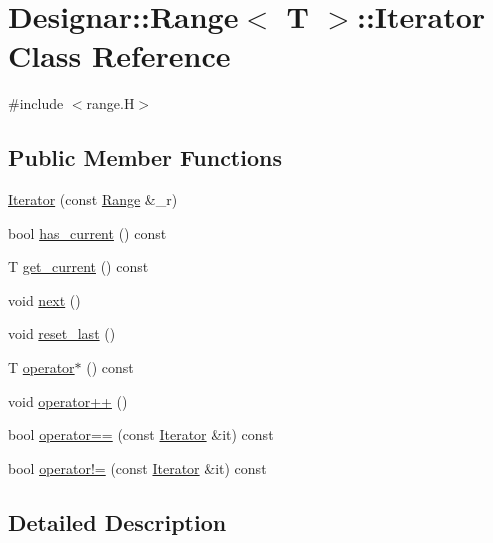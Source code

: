 \hypertarget{class_designar_1_1_range_1_1_iterator}{}\section{Designar\+:\+:Range$<$ T $>$\+:\+:Iterator Class Reference}
\label{class_designar_1_1_range_1_1_iterator}


{\ttfamily \#include $<$range.\+H$>$}

\subsection*{Public Member Functions}
\begin{DoxyCompactItemize}
\item 
\hyperlink{class_designar_1_1_range_1_1_iterator_a25257fadc62207bcc4ca4b82b2b4c0cb}{Iterator} (const \hyperlink{class_designar_1_1_range}{Range} \&\+\_\+r)
\item 
bool \hyperlink{class_designar_1_1_range_1_1_iterator_a9645d6d68aa53949d8c85d2af91e55c9}{has\+\_\+current} () const
\item 
T \hyperlink{class_designar_1_1_range_1_1_iterator_a388c108434e6ff65af07ee3bc0d98204}{get\+\_\+current} () const
\item 
void \hyperlink{class_designar_1_1_range_1_1_iterator_ad337cc1a463bd9ebea6691efdc5b7b4f}{next} ()
\item 
void \hyperlink{class_designar_1_1_range_1_1_iterator_ae5a8045527f0582b9a0f126ccf50ae19}{reset\+\_\+last} ()
\item 
T \hyperlink{class_designar_1_1_range_1_1_iterator_a509ac661c1e51ad60c37e1d8a82e9442}{operator$\ast$} () const
\item 
void \hyperlink{class_designar_1_1_range_1_1_iterator_accce459b0752c7e347c8434582b58268}{operator++} ()
\item 
bool \hyperlink{class_designar_1_1_range_1_1_iterator_a0c3ce6ecdc451e8f8f91d114485abb2b}{operator==} (const \hyperlink{class_designar_1_1_range_1_1_iterator}{Iterator} \&it) const
\item 
bool \hyperlink{class_designar_1_1_range_1_1_iterator_a06ee05b2aae390d9520de1683ff9ff01}{operator!=} (const \hyperlink{class_designar_1_1_range_1_1_iterator}{Iterator} \&it) const
\end{DoxyCompactItemize}


\subsection{Detailed Description}
